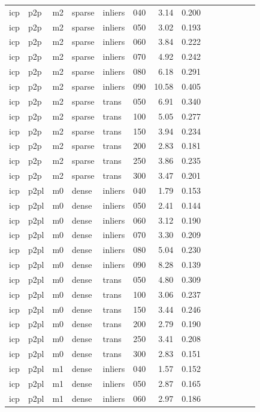 \begin{table}[htbp]
\begin{tabular}{llllllrrrrrrrr}
  icp & p2p & m2 & sparse & inliers & 040 & 3.14 & 0.200 \\
  icp & p2p & m2 & sparse & inliers & 050 & 3.02 & 0.193 \\
  icp & p2p & m2 & sparse & inliers & 060 & 3.84 & 0.222 \\
  icp & p2p & m2 & sparse & inliers & 070 & 4.92 & 0.242 \\
  icp & p2p & m2 & sparse & inliers & 080 & 6.18 & 0.291 \\
  icp & p2p & m2 & sparse & inliers & 090 & 10.58 & 0.405 \\
  icp & p2p & m2 & sparse & trans & 050 & 6.91 & 0.340 \\
  icp & p2p & m2 & sparse & trans & 100 & 5.05 & 0.277 \\
  icp & p2p & m2 & sparse & trans & 150 & 3.94 & 0.234 \\
  icp & p2p & m2 & sparse & trans & 200 & 2.83 & 0.181 \\
  icp & p2p & m2 & sparse & trans & 250 & 3.86 & 0.235 \\
  icp & p2p & m2 & sparse & trans & 300 & 3.47 & 0.201 \\
  icp & p2pl & m0 & dense & inliers & 040 & 1.79 & 0.153 \\
  icp & p2pl & m0 & dense & inliers & 050 & 2.41 & 0.144 \\
  icp & p2pl & m0 & dense & inliers & 060 & 3.12 & 0.190 \\
  icp & p2pl & m0 & dense & inliers & 070 & 3.30 & 0.209 \\
  icp & p2pl & m0 & dense & inliers & 080 & 5.04 & 0.230 \\
  icp & p2pl & m0 & dense & inliers & 090 & 8.28 & 0.139 \\
  icp & p2pl & m0 & dense & trans & 050 & 4.80 & 0.309 \\
  icp & p2pl & m0 & dense & trans & 100 & 3.06 & 0.237 \\
  icp & p2pl & m0 & dense & trans & 150 & 3.44 & 0.246 \\
  icp & p2pl & m0 & dense & trans & 200 & 2.79 & 0.190 \\
  icp & p2pl & m0 & dense & trans & 250 & 3.41 & 0.208 \\
  icp & p2pl & m0 & dense & trans & 300 & 2.83 & 0.151 \\
  icp & p2pl & m1 & dense & inliers & 040 & 1.57 & 0.152 \\
  icp & p2pl & m1 & dense & inliers & 050 & 2.87 & 0.165 \\
  icp & p2pl & m1 & dense & inliers & 060 & 2.97 & 0.186 \\

\end{tabular}
\end{table}
